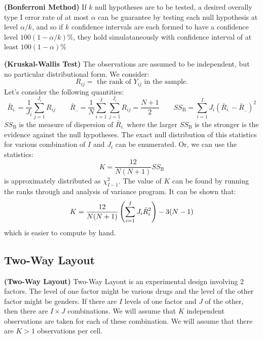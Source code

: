 \begin{definition}{\textbf{(Bonferroni Method)}}
    If $k$ null hypotheses are to be tested, a desired overally type I error rate of at most $\alpha$ can be guarantee by testing each null hypothesis at level $\alpha/k$, and so if $k$ confidence intervals are each formed to have a confidence level $100(1-\alpha/k)\%$, they hold simulataneously with confidence interval of at least $100(1-\alpha)\%$
\end{definition}


\begin{definition}{\textbf{(Kruskal-Wallis Test)}}
    The observations are assumed to be independent, but no particular distributional form. We consider:
    \begin{equation*}
        R_{ij} = \text{ the rank of }  Y_{ij} \text{ in the sample.}
    \end{equation*}
    Let's consider the following quantities:
    \begin{equation*}
        \bar{R}_{i.} = \frac{1}{J_i}\sum^{J_i}_{j=1} R_{ij} \qquad \bar{R}_{..} = \frac{1}{N}\sum^I_{i=1}\sum^{J_i}_{j=1} R_{ij} = \frac{N+1}{2} \qquad SS_\text{B} = \sum^I_{i=1}J_i(\bar{R}_{i.} - \bar{R}_{..})^2
    \end{equation*}
    $SS_\text{B}$ is the measure of dispersion of $\bar{R}_{i.}$ where the larger $SS_\text{B}$ is the stronger is the evidence against the null hypotheses. The exact null distribution of this statistics for various combination of $I$ and $J_i$ can be enumerated. Or, we can use the statistics:
    \begin{equation*}
        K = \frac{12}{N(N+1)}SS_\text{B}
    \end{equation*}
    is approximately distributed as $\chi^2_{I-1}$. The value of $K$ can be found by running the ranks through and analysis of variance program. It can be shown that:
    \begin{equation*}
        K = \frac{12}{N(N+1)}\left( \sum^I_{i=1}J_i\bar{R}_i^2 \right) - 3(N-1)
    \end{equation*}
    which is easier to compute by hand. 
\end{definition}

\subsection{Two-Way Layout}

\begin{definition}{\textbf{(Two-Way Layout)}}
    Two-Way Layout is an experimental design involving 2 factors. The level of one factor might be various drugs and the level of the other factor might be genders. If there are $I$ levels of one factor and $J$ of the other, then there are $I\times J$ combinations. We will assume that $K$ independent observations are taken for each of these combination. We will assume that there are $K>1$ observations per cell.
\end{definition}

